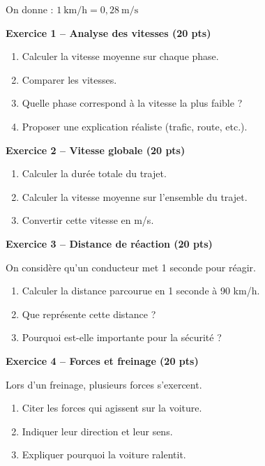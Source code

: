 \documentclass[11pt,a4paper]{article}
\begin{document}
On donne : $1\ \text{km/h} = 0{,}28\ \text{m/s}$

\bigskip

\textbf{Exercice 1 – Analyse des vitesses (20 pts)}

\begin{enumerate}
\item Calculer la vitesse moyenne sur chaque phase.
\item Comparer les vitesses.
\item Quelle phase correspond à la vitesse la plus faible ?
\item Proposer une explication réaliste (trafic, route, etc.).
\end{enumerate}

\bigskip

\textbf{Exercice 2 – Vitesse globale (20 pts)}

\begin{enumerate}
\item Calculer la durée totale du trajet.
\item Calculer la vitesse moyenne sur l’ensemble du trajet.
\item Convertir cette vitesse en m/s.
\end{enumerate}

\bigskip

\textbf{Exercice 3 – Distance de réaction (20 pts)}

On considère qu’un conducteur met 1 seconde pour réagir.

\begin{enumerate}
\item Calculer la distance parcourue en 1 seconde à 90 km/h.
\item Que représente cette distance ?
\item Pourquoi est-elle importante pour la sécurité ?
\end{enumerate}

\bigskip

\textbf{Exercice 4 – Forces et freinage (20 pts)}

Lors d’un freinage, plusieurs forces s’exercent.

\begin{enumerate}
\item Citer les forces qui agissent sur la voiture.
\item Indiquer leur direction et leur sens.
\item Expliquer pourquoi la voiture ralentit.
\end{enumerate}
\end{document}
